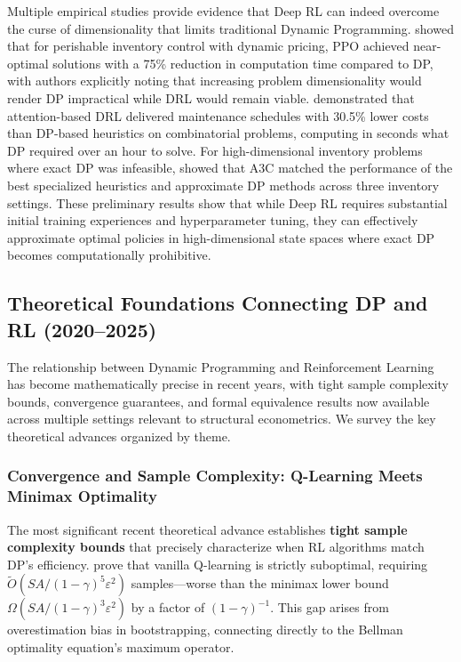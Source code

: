 Multiple empirical studies provide evidence that Deep RL can indeed overcome the curse of dimensionality that limits traditional Dynamic Programming. \cite{nomura2025} showed that for perishable inventory control with dynamic pricing, PPO achieved near-optimal solutions with a 75\% reduction in computation time compared to DP, with authors explicitly noting that increasing problem dimensionality would render DP impractical while DRL would remain viable. \cite{sabri2024} demonstrated that attention-based DRL delivered maintenance schedules with 30.5\% lower costs than DP-based heuristics on combinatorial problems, computing in seconds what DP required over an hour to solve. For high-dimensional inventory problems where exact DP was infeasible, \cite{boute2022} showed that A3C matched the performance of the best specialized heuristics and approximate DP methods across three inventory settings. These preliminary results show that while Deep RL requires substantial initial training experiences and hyperparameter tuning, they can effectively approximate optimal policies in high-dimensional state spaces where exact DP becomes computationally prohibitive.

\subsection{Theoretical Foundations Connecting DP and RL (2020--2025)}

The relationship between Dynamic Programming and Reinforcement Learning has become mathematically precise in recent years, with tight sample complexity bounds, convergence guarantees, and formal equivalence results now available across multiple settings relevant to structural econometrics. We survey the key theoretical advances organized by theme.

\subsubsection{Convergence and Sample Complexity: Q-Learning Meets Minimax Optimality}

The most significant recent theoretical advance establishes \textbf{tight sample complexity bounds} that precisely characterize when RL algorithms match DP's efficiency. \citet{li2024minimax} prove that vanilla Q-learning is strictly suboptimal, requiring $\tilde{O}(SA/(1-\gamma)^5\varepsilon^2)$ samples---worse than the minimax lower bound $\Omega(SA/(1-\gamma)^3\varepsilon^2)$ by a factor of $(1-\gamma)^{-1}$. This gap arises from overestimation bias in bootstrapping, connecting directly to the Bellman optimality equation's maximum operator.


